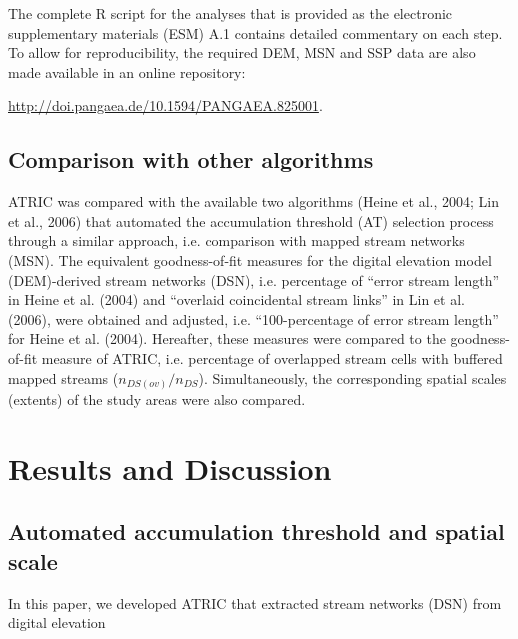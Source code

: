 The complete R script for the analyses that is provided as the electronic supplementary materials (ESM) A.1 contains detailed commentary on each step. To allow for reproducibility, the required DEM, MSN and SSP data are also made available in an online repository:

\noindent \href{http://doi.pangaea.de/10.1594/PANGAEA.825001}{http://doi.pangaea.de/10.1594/PANGAEA.825001}.

\subsection{Comparison with other algorithms}
\label{Comparison with other algorithms}

ATRIC was compared with the available two algorithms (Heine et al., 2004; Lin et al., 2006) that automated the accumulation threshold (AT) selection process through a similar approach, i.e. comparison with mapped stream networks (MSN). The equivalent goodness-of-fit measures for the digital elevation model (DEM)-derived stream networks (DSN), i.e. percentage of “error stream length” in Heine et al. (2004) and “overlaid coincidental stream links” in Lin et al. (2006), were obtained and adjusted, i.e. “100-percentage of error stream length” for Heine et al. (2004). Hereafter, these measures were compared to the goodness-of-fit measure of ATRIC, i.e. percentage of overlapped stream cells with buffered mapped streams ($n_{DS(ov)}/n_{DS}$). Simultaneously, the corresponding spatial scales (extents) of the study areas were also compared.

\section{Results and Discussion}
\label{Results and Discussion}

\subsection{Automated accumulation threshold and spatial scale}
\label{Automated accumulation threshold and spatial scale}

In this paper, we developed ATRIC that extracted stream networks (DSN) from digital elevation

